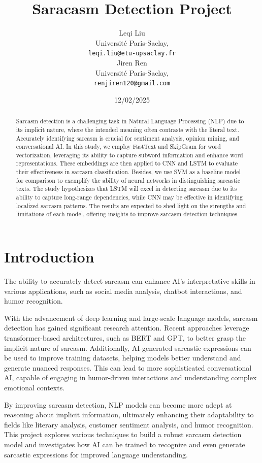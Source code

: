 \documentclass[11pt]{article}
\title{Saracasm Detection Project}
\author{Leqi Liu \\
  Université Paris-Saclay, \\
  {\tt leqi.liu@etu-upsaclay.fr} \\\And
    Jiren Ren \\
   Université Paris-Saclay, \\
  {\tt renjiren120@gmail.com} \\}
\date{12/02/2025}
\begin{document}
\maketitle
\begin{abstract}
Sarcasm detection is a challenging task in Natural Language Processing (NLP) due to its implicit nature, where the intended meaning often contrasts with the literal text. Accurately identifying sarcasm is crucial for sentiment analysis, opinion mining, and conversational AI. In this study, we employ FastText and SkipGram for word vectorization, leveraging its ability to capture subword information and enhance word representations. These embeddings are then applied to CNN and LSTM to evaluate their effectiveness in sarcasm classification. Besides, we use SVM as a baseline model for comparison to exemplify the ability of neural networks in distinguishing sarcastic texts. The study hypothesizes that LSTM will excel in detecting sarcasm due to its ability to capture long-range dependencies, while CNN may be effective in identifying localized sarcasm patterns. The results are expected to shed light on the strengths and limitations of each model, offering insights to improve sarcasm detection techniques.
\end{abstract}

\section{Introduction}
The ability to accurately detect sarcasm can enhance AI's interpretative skills in various applications, such as social media analysis, chatbot interactions, and humor recognition.

With the advancement of deep learning and large-scale language models, sarcasm detection has gained significant research attention. Recent approaches leverage transformer-based architectures, such as BERT and GPT, to better grasp the implicit nature of sarcasm. Additionally, AI-generated sarcastic expressions can be used to improve training datasets, helping models better understand and generate nuanced responses. This can lead to more sophisticated conversational AI, capable of engaging in humor-driven interactions and understanding complex emotional contexts.

By improving sarcasm detection, NLP models can become more adept at reasoning about implicit information, ultimately enhancing their adaptability to fields like literary analysis, customer sentiment analysis, and humor recognition. This project explores various techniques to build a robust sarcasm detection model and investigates how AI can be trained to recognize and even generate sarcastic expressions for improved language understanding.
\end{document}
